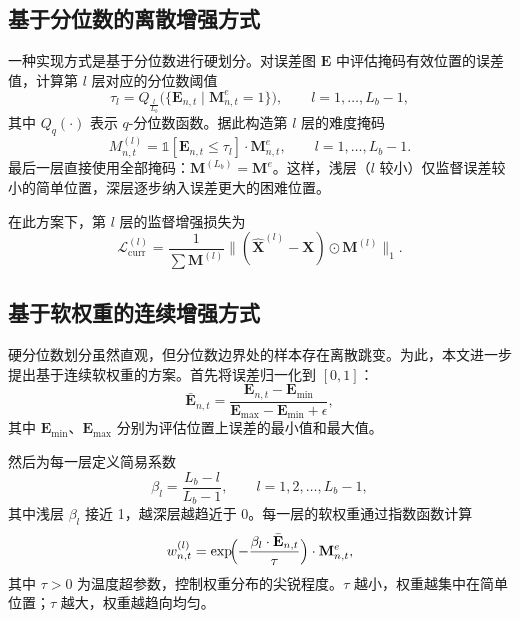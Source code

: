 \subsection{基于分位数的离散增强方式}

一种实现方式是基于分位数进行硬划分。对误差图 $\mathbf{E}$ 中评估掩码有效位置的误差值，计算第 $l$ 层对应的分位数阈值
\begin{equation}
\tau_l = Q_{\frac{l}{L_b}}\bigl(\{\mathbf{E}_{n,t} \mid \mathbf{M}^{e}_{n,t}=1\}\bigr), \qquad l=1,\dots,L_b-1,
\end{equation}
其中 $Q_q(\cdot)$ 表示 $q$-分位数函数。据此构造第 $l$ 层的难度掩码
\begin{equation}
M^{(l)}_{n,t} = \mathbb{1}[\mathbf{E}_{n,t} \leq \tau_l] \cdot \mathbf{M}^{e}_{n,t}, \qquad l=1,\dots,L_b-1.
\end{equation}
最后一层直接使用全部掩码：$\mathbf{M}^{(L_b)} = \mathbf{M}^{e}$。这样，浅层（$l$ 较小）仅监督误差较小的简单位置，深层逐步纳入误差更大的困难位置。

在此方案下，第 $l$ 层的监督增强损失为
\begin{equation}
\mathcal{L}^{(l)}_{\mathrm{curr}} = \frac{1}{\sum \mathbf{M}^{(l)}}
\bigl\|(\hat{\mathbf{X}}^{(l)} - \mathbf{X}) \odot \mathbf{M}^{(l)}\bigr\|_1.
\end{equation}

\subsection{基于软权重的连续增强方式}

硬分位数划分虽然直观，但分位数边界处的样本存在离散跳变。为此，本文进一步提出基于连续软权重的方案。首先将误差归一化到 $[0,1]$：
\begin{equation}
\bar{\mathbf{E}}_{n,t} = \frac{\mathbf{E}_{n,t} - \mathbf{E}_{\min}}{\mathbf{E}_{\max} - \mathbf{E}_{\min} + \epsilon},
\end{equation}
其中 $\mathbf{E}_{\min}$、$\mathbf{E}_{\max}$ 分别为评估位置上误差的最小值和最大值。

然后为每一层定义简易系数
\begin{equation}
\beta_l = \frac{L_b - l}{L_b - 1}, \qquad l=1,2,\dots,L_b-1,
\end{equation}
其中浅层 $\beta_l$ 接近 1，越深层越趋近于 0。每一层的软权重通过指数函数计算
\begin{equation}
w^{(l)}_{n,t} = \exp\!\Bigl(-\frac{\beta_l \cdot \bar{\mathbf{E}}_{n,t}}{\tau}\Bigr) \cdot \mathbf{M}^{e}_{n,t},
\end{equation}
其中 $\tau > 0$ 为温度超参数，控制权重分布的尖锐程度。$\tau$ 越小，权重越集中在简单位置；$\tau$ 越大，权重越趋向均匀。

